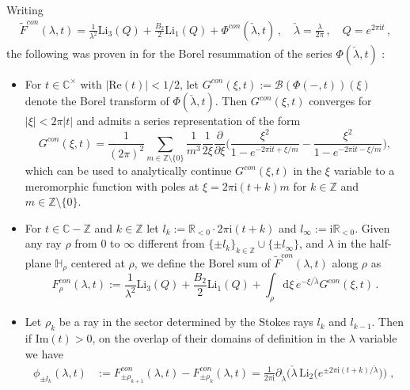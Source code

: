 \documentclass[a4paper,12pt,justification=centering]{article}
\numberwithin{equation}{section}
\newcommand{\I}{{\mathrm i}}
\theoremstyle{plain}%
\theoremstyle{definition}
\begin{document}
Writing
\begin{align*}\label{formal}
\widetilde{F}^{con}(\lambda,t) =\frac{1}{\lambda^2} \mathrm{Li}_{3}(Q)  +\frac{B_2}{2}\mathrm{Li}_1(Q)+ \Phi^{con}(\check{\lambda},t)\,, \quad \check{\lambda}=\frac{\lambda}{2\pi}\,, \quad Q=e^{2\pi \I t}\,,
\end{align*} 
the following was proven in \cite{Alim:2021mhp} for the Borel resummation of the series $\Phi(\check \lambda,t)$ :
\begin{itemize}
\item[(i)] For $t\in \mathbb{C}^{\times}$ with $|\mathrm{Re}(t)|<1/2$, let $G^{con}(\xi,t):=\mathcal{B}(\Phi(-,t))(\xi)$ denote the Borel transform of $\Phi(\check \lambda,t)$. Then $G^{con}(\xi,t)$ converges for $|\xi|<2\pi |t|$ and admits a series representation of the form
    \begin{equation}\label{Borel-sum}
        G^{con}(\xi,t) = \frac{1}{(2\pi )^2}\sum_{m\in\mathbb{Z} \setminus \{0\}}\frac{1}{m^3}
        \frac{1}{2\xi}\frac{\partial}{\partial \xi}
        \bigg(\frac{\xi^2}{1-e^{-2\pi \I t + \xi/m}}-\frac{\xi^2}{1-e^{-2\pi \I t - \xi/m}}\bigg),
\end{equation}
which can be used to analytically continue $G^{con}(\xi,t)$ in the $\xi$ variable to a meromorphic function with poles at $\xi=2\pi \I(t+k)m$ for $k \in \mathbb{Z}$ and $m \in \mathbb{Z}\setminus\{0\}$.
\item[(ii)] For $t\in \mathbb{C}-\mathbb{Z}$ and  $k\in \mathbb{Z}$ let $l_k:=\mathbb{R}_{<0}\cdot 2\pi \I(t+k)$ and $l_{\infty}:=\I\mathbb{R}_{<0}$. Given any ray $\rho$ from $0$ to $\infty$ different from $\{\pm l_{k}\}_{k\in \mathbb{Z}}\cup \{\pm l_{\infty}\}$, and $\lambda$ in the half-plane $\mathbb{H}_{\rho}$ centered at $\rho$, we define the Borel sum of $\widetilde{F}^{con}(\lambda,t)$ along $\rho$ as
\begin{equation}\label{BorelS}
    F^{con}_{\rho}(\lambda,t):=\frac{1}{\lambda^2} \mathrm{Li}_{3}(Q)+ \frac{B_2}{2}\mathrm{Li}_{1}(Q)+\int_{\rho}\mathrm d\xi\, e^{-\xi/\check{\lambda}} G^{con}(\xi,t)\,.
\end{equation}
\item[(iii)] Let $\rho_k$ be a ray in the sector determined by the Stokes rays $l_{k}$ and $l_{k-1}$. Then if $\mathrm{Im}(t)>0$, on the overlap of their domains of definition in the $\lambda$ variable we have
\begin{align}
    \phi_{\pm l_k}(\lambda,t)&:=F^{con}_{\pm \rho_{k+1}}(\lambda,t)
    -F^{con}_{\pm \rho_k}(\lambda,t) =\frac{1}{2\pi \I}\partial_{\check\lambda}\Big(\check{\lambda}\,\mathrm{Li}_2\big(e^{\pm 2\pi \I(t+k)/\check \lambda}\big)\Big)\;, \, \\

\end{align}
\end{itemize}
\end{document}
